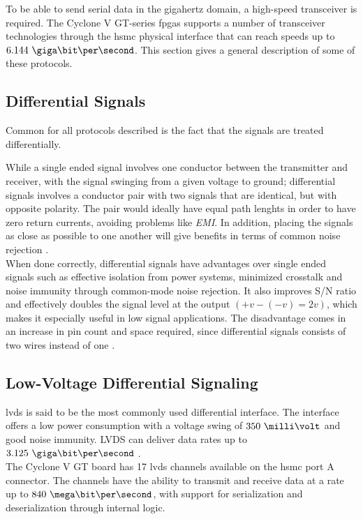 \documentclass[main.tex]{subfiles}
\begin{document}
To be able to send serial data in the gigahertz domain, a high-speed transceiver is required. The Cyclone V GT-series \glspl{fpga} supports a number of transceiver technologies through the \gls{hsmc} physical interface that can reach speeds up to $6.144\ \giga\bit\per\second$. This section gives a general description of some of these protocols.

\subsection{Differential Signals} \label{subsec:diffsig}

Common for all protocols described is the fact that the signals are treated differentially. 

While a single ended signal involves one conductor between the transmitter and receiver, with the signal swinging from a given voltage to ground; differential signals involves a conductor pair with two signals that are identical, but with opposite polarity. The pair would ideally have equal path lenghts in order to have zero return currents, avoiding problems like \textit{EMI}. In addition, placing the signals as close as possible to one another will give benefits in terms of common noise rejection \cite{douglas01}.\\

When done correctly, differential signals have advantages over single ended signals such as effective isolation from power systems, minimized crosstalk and noise immunity through common-mode noise rejection. It also improves S/N ratio and effectively doubles the signal level at the output $(+v - (-v) = 2v)$, which makes it especially useful in low signal applications. The disadvantage comes in an increase in pin count and space required, since differential signals consists of two wires instead of one \cite{douglas01}.

\subsection{Low-Voltage Differential Signaling}

\gls{lvds} is said to be the most commonly used differential interface. The interface offers a low power consumption with a voltage swing of $350\ \milli\volt$ and good noise immunity. LVDS can deliver data rates up to $3.125\ \giga\bit\per\second$ \cite{ti08lvds}.\\

The Cyclone V GT board has 17 \gls{lvds} channels available on the \gls{hsmc} port A connector. The channels have the ability to transmit and receive data at a rate up to $840\ \mega\bit\per\second$, with support for serialization and deserialization through internal logic. \cite{altera_cvoverview15}
\end{document}
